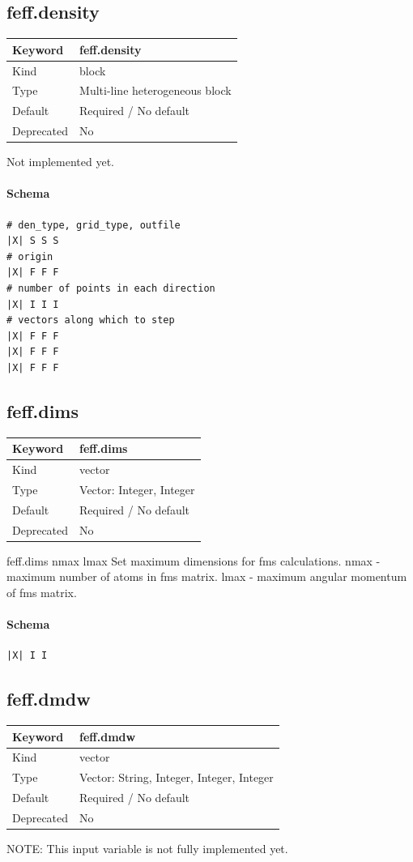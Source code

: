 \documentclass[11pt]{article}
\begin{document}
{{{\subsection{feff.density}
\label{kw:feff-density}
\begin{longtable}{|p{1.5in}|p{4.5in}|}
\hline
Keyword & feff.density \\
\hline
Kind & block \\
\hline
Type & Multi-line heterogeneous block \\
\hline
Default & Required / No default \\
\hline
Deprecated & No \\
\hline
\end{longtable}
 Not implemented yet.

\paragraph{Schema}
\begin{Verbatim}
# den_type, grid_type, outfile
|X| S S S
# origin
|X| F F F
# number of points in each direction
|X| I I I
# vectors along which to step
|X| F F F
|X| F F F
|X| F F F
\end{Verbatim}

\subsection{feff.dims}
\label{kw:feff-dims}
\begin{longtable}{|p{1.5in}|p{4.5in}|}
\hline
Keyword & feff.dims \\
\hline
Kind & vector \\
\hline
Type & Vector: Integer, Integer \\
\hline
Default & Required / No default \\
\hline
Deprecated & No \\
\hline
\end{longtable}
 feff.dims{ nmax lmax }
 Set maximum dimensions for fms calculations.
 nmax - maximum number of atoms in fms matrix.
 lmax - maximum angular momentum of fms matrix.

\paragraph{Schema}
\begin{Verbatim}
|X| I I
\end{Verbatim}

\subsection{feff.dmdw}
\label{kw:feff-dmdw}
\begin{longtable}{|p{1.5in}|p{4.5in}|}
\hline
Keyword & feff.dmdw \\
\hline
Kind & vector \\
\hline
Type & Vector: String, Integer, Integer, Integer \\
\hline
Default & Required / No default \\
\hline
Deprecated & No \\
\hline
\end{longtable}
 NOTE: This input variable is not fully implemented yet.

}}}
\end{document}
